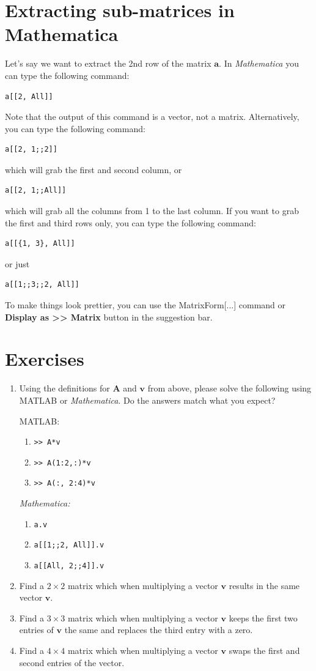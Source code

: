 \documentclass{tufte-handout}
\begin{document}
\section{Extracting sub-matrices in Mathematica}
Let's say we want to extract the 2nd row of the matrix $\mathbf{a}$. In \textit{Mathematica} you can type the following command:
\begin{verbatim}
a[[2, All]]
\end{verbatim}
Note that the output of this command is a vector, not a matrix. Alternatively, you can type the following command:
\begin{verbatim}
a[[2, 1;;2]]
\end{verbatim}
which will grab the first and second column, or
\begin{verbatim}
a[[2, 1;;All]]
\end{verbatim}
which will grab all the columns from 1 to the last column. If you want to grab the first and third rows only, you can type the following command:
\begin{verbatim}
a[[{1, 3}, All]]
\end{verbatim}
or just
\begin{verbatim}
a[[1;;3;;2, All]]
\end{verbatim}
To make things look prettier, you can use the MatrixForm[...] command or \textbf{Display as >> Matrix} button in the suggestion bar.

\section{Exercises}
\begin{enumerate}[resume]
\item Using the definitions for $\mathbf{A}$ and $\mathbf{v}$ from above, please solve the following using MATLAB or \textit{Mathematica}. Do the answers match what you expect?

MATLAB:
\begin{enumerate}
\item {\tt  >>  A*v}
\item {\tt  >>  A(1:2,:)*v}
\item {\tt  >> A(:, 2:4)*v} %
\end{enumerate}
\textit{Mathematica:}
\begin{enumerate}
\item {\tt    a.v}
\item {\tt    a[[1;;2, All]].v}
\item {\tt    a[[All, 2;;4]].v} %
\end{enumerate}
\item Find a $2 \times 2$ matrix which when multiplying a vector $\mathbf{v}$ results in the same vector $\mathbf{v}$.
\item Find a $3 \times 3$ matrix which when multiplying a vector $\mathbf{v}$ keeps the first two entries of $\mathbf{v}$ the same and replaces the third entry with a zero.
\item Find a $4 \times 4$ matrix which when multiplying a vector $\mathbf{v}$ swaps the first and second entries of the vector.
\end{enumerate}
\end{document}
